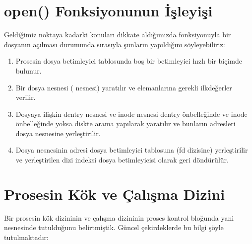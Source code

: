 \documentclass[a4paper,10pt,turkish]{sphinxmanual}
\begin{document}
\section{open() Fonksiyonunun İşleyişi}
\label{\detokenize{filesystem1:open-fonksiyonunun-isleyisi}}
\sphinxAtStartPar
Geldiğimiz noktaya kadarki konuları dikkate aldığımızda  fonksiyonuyla bir dosyanın
açılması durumunda sırasıyla şunların yapıldığını söyleyebiliriz:
\begin{enumerate}
%
\item {} 
\sphinxAtStartPar
Prosesin dosya betimleyici tablosunda boş bir betimleyici hızlı bir biçimde bulunur.

\item {} 
\sphinxAtStartPar
Bir dosya nesnesi ( nesnesi) yaratılır ve elemanlarına gerekli ilkdeğerler
verilir.

\item {} 
\sphinxAtStartPar
Dosyaya ilişkin dentry nesnesi ve inode nesnesi dentry önbelleğinde ve inode önbelleğinde
yoksa diskte arama yapılarak yaratılır ve bunların adresleri dosya nesnesine yerleştirilir.

\item {} 
\sphinxAtStartPar
Dosya nesnesinin adresi dosya betimleyici tablosuna (fd dizisine) yerleştirilir ve yerleştirilen
dizi indeksi dosya betimleyicisi olarak geri döndürülür.

\end{enumerate}


\section{Prosesin Kök ve Çalışma Dizini}
\label{\detokenize{filesystem1:prosesin-kok-ve-calisma-dizini}}
\sphinxAtStartPar
Bir prosesin kök dizininin ve çalışma dizininin proses kontrol bloğunda yani 
nesnesinde tutulduğunu belirtmiştik. Güncel çekirdeklerde bu bilgi şöyle tutulmaktadır:
\end{document}
